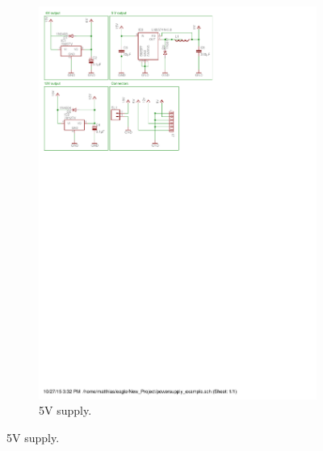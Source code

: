 \begin{figure}[H]
\begin{subfigure}{0.3\linewidth}
\end{subfigure}
\begin{subfigure}{0.4\linewidth}
\centering
\includegraphics[scale=0.8,trim={5.3cm 24cm 7.8cm 0.6cm},clip]{img/powersupply.pdf}
\caption{5V supply.}
\label{fig::sch_power_5V}
\end{subfigure}


\end{figure}
